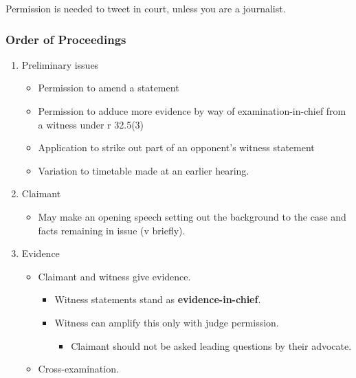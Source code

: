 \documentclass[
]{article}
\providecommand{\tightlist}{%
  \setlength{\itemsep}{0pt}\setlength{\parskip}{0pt}}
\begin{document}
Permission is needed to tweet in court, unless you are a journalist.

\hypertarget{order-of-proceedings}{%
\subsubsection{Order of Proceedings}\label{order-of-proceedings}}

\begin{enumerate}
\def\labelenumi{\arabic{enumi}.}
\tightlist
\item
  Preliminary issues

  \begin{itemize}
  \tightlist
  \item
    Permission to amend a statement
  \item
    Permission to adduce more evidence by way of examination-in-chief
    from a witness under r 32.5(3)
  \item
    Application to strike out part of an opponent's witness statement
  \item
    Variation to timetable made at an earlier hearing.
  \end{itemize}
\item
  Claimant

  \begin{itemize}
  \tightlist
  \item
    May make an opening speech setting out the background to the case
    and facts remaining in issue (v briefly).
  \end{itemize}
\item
  Evidence

  \begin{itemize}
  \tightlist
  \item
    Claimant and witness give evidence.

    \begin{itemize}
    \tightlist
    \item
      Witness statements stand as \textbf{evidence-in-chief}.
    \item
      Witness can amplify this only with judge permission.

      \begin{itemize}
      \tightlist
      \item
        Claimant should not be asked leading questions by their
        advocate.
      \end{itemize}
    \end{itemize}
  \item
    Cross-examination.


\end{itemize}
\end{enumerate}
\end{document}
